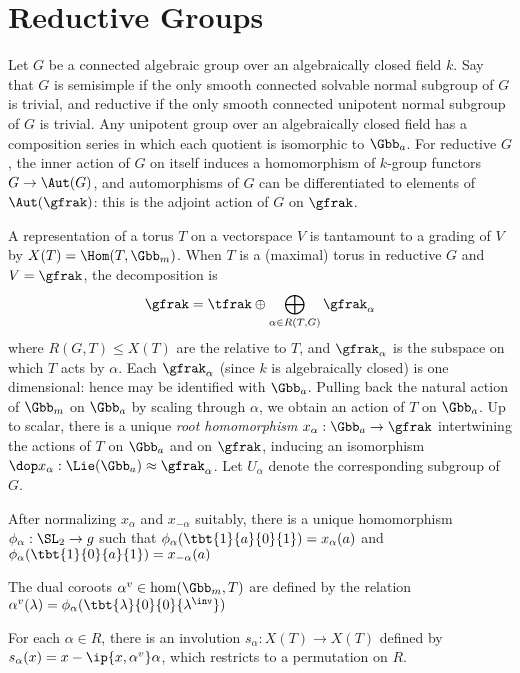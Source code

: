\documentclass{amsart}
\begin{document}
\section{Reductive Groups}
  Let $G$ be a connected algebraic group over an algebraically closed field $k$.  Say that $G$ is semisimple if the only smooth connected solvable normal subgroup of $G$ is trivial, and reductive if the only smooth connected unipotent normal subgroup of $G$ is trivial. Any unipotent group over an algebraically closed field has a composition series in which each quotient is isomorphic to $\Gbb_a$. For reductive $G$, the inner action of $G$ on itself induces a homomorphism of $k$-group functors $G \to \Aut(G)$, and automorphisms of $G$ can be differentiated to elements of $\Aut(\gfrak)$: this is the adjoint action of $G$ on $\gfrak$.

  A representation of a torus $T$ on a vectorspace $V$ is tantamount to a grading of $V$ by $X(T) = \Hom(T,\Gbb_m)$. When $T$ is a (maximal) torus  in reductive $G$ and $V = \gfrak$, the decomposition is
        \begin{align*}
          \gfrak = \tfrak \oplus \bigoplus_{\alpha \in R(T,G)} \gfrak_\alpha
        \end{align*}
        where $R(G,T) \leq X(T)$ are the relative to $T$, and $\gfrak_\alpha$ is the subspace on which $T$ acts by $\alpha$. Each $\gfrak_\alpha$ (since $k$ is algebraically closed) is one dimensional: hence may be identified with $\Gbb_a$. Pulling back the natural action of $\Gbb_m$ on $\Gbb_a$ by scaling through $\alpha$, we obtain an action of $T$ on $\Gbb_a$. Up to scalar, there is a unique \emph{root homomorphism} $x_\alpha : \Gbb_a \to \gfrak$ intertwining the actions of $T$ on $\Gbb_a$ and on $\gfrak$, inducing an isomorphism $\dop x_\alpha : \Lie(\Gbb_a) \approx \gfrak_\alpha$. Let $U_\alpha$ denote the corresponding subgroup of $G$.

        After normalizing $x_\alpha$ and $x_{-\alpha}$ suitably, there is a unique homomorphism $\phi_\alpha:\SL_2 \to g$ such that $\phi_\alpha(\tbt{1}{a}{0}{1}) = x_\alpha(a)$ and $\phi_{\alpha} (\tbt{1}{0}{a}{1}) = x_{-\alpha}(a)$

    The dual coroots $\alpha^v \in \hom(\Gbb_m,T)$ are defined by the relation $\alpha^v(\lambda) = \phi_\alpha(\tbt{\lambda}{0}{0}{\lambda^\inv})$

    For each $\alpha \in R$, there is an involution $s_\alpha : X(T) \to X(T)$ defined by $s_\alpha (x) = x - \ip{x, \alpha^v}\alpha$, which restricts to a permutation on $R$.
\end{document}
